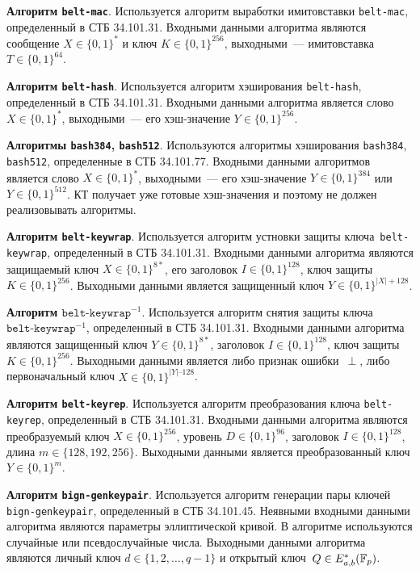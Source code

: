 {\bf Алгоритм \texttt{belt-mac}}.
Используется алгоритм выработки имитовставки \texttt{belt-mac}, 
определенный в СТБ 34.101.31. Входными данными алгоритма 
являются сообщение $X\in\{0,1\}^*$ и ключ $K\in\{0,1\}^{256}$, 
выходными~--- имитовставка $T\in\{0,1\}^{64}$.

{\bf Алгоритм \texttt{belt-hash}}.
Используется алгоритм хэширования \texttt{belt-hash},
определенный в СТБ 34.101.31. Входными данными алгоритма 
является слово $X\in\{0,1\}^*$, выходными~--- 
его хэш-значение $Y\in\{0,1\}^{256}$.

{\bf Алгоритмы \texttt{bash384}, \texttt{bash512}}.
Используются алгоритмы хэширования \texttt{bash384}, \texttt{bash512},
определенные в СТБ 34.101.77. Входными данными алгоритмов
является слово $X\in\{0,1\}^*$, выходными~--- 
его хэш-значение $Y\in\{0,1\}^{384}$ или $Y\in\{0,1\}^{512}$.
%
КТ получает уже готовые хэш-значения и поэтому не должен реализовывать 
алгоритмы. 

{\bf Алгоритм \texttt{belt-keywrap}}.
Используется алгоритм устновки защиты ключа~\texttt{belt-keywrap}, 
определенный в СТБ 34.101.31. Входными данными алгоритма являются 
защищаемый ключ $X\in\{0,1\}^{8*}$, его заголовок $I\in\{0,1\}^{128}$, ключ 
защиты $K\in\{0,1\}^{256}$. 
Выходными данными является защищенный ключ $Y\in\{0,1\}^{|X|+128}$.

{\bf Алгоритм $\texttt{belt-keywrap}^{-1}$}.
Используется алгоритм снятия защиты ключа~$\texttt{belt-keywrap}^{-1}$, 
определенный в СТБ 34.101.31. Входными данными алгоритма являются 
защищенный ключ $Y\in\{0,1\}^{8*}$, заголовок $I\in\{0,1\}^{128}$, 
ключ защиты $K\in\{0,1\}^{256}$. Выходными данными является либо признак 
ошибки~$\perp$, либо первоначальный ключ $X\in\{0,1\}^{|Y|–128}$.

{\bf Алгоритм \texttt{belt-keyrep}}.
Используется алгоритм преобразования ключа 
\texttt{belt-keyrep}, определенный в СТБ 34.101.31.
Входными данными алгоритма являются преобразуемый ключ $X\in\{0,1\}^{256}$, 
уровень $D\in\{0,1\}^{96}$, заголовок $I\in\{0,1\}^{128}$, 
длина $m\in\{128,192,256\}$. Выходными данными 
является преобразованный ключ $Y\in\{0,1\}^{m}$.

{\bf Алгоритм \texttt{bign-genkeypair}}.
Используется алгоритм генерации пары ключей 
\texttt{bign-genkeypair}, определенный в СТБ 34.101.45.
Неявными входными данными алгоритма являются параметры эллиптической кривой.
В алгоритме используются случайные или псевдослучайные числа. 
Выходными данными алгоритма являются личный ключ $d\in\{1,2,\ldots,q-1\}$ 
и открытый ключ~$Q\in E_{a,b}^*({\mathbb F}_p)$.

